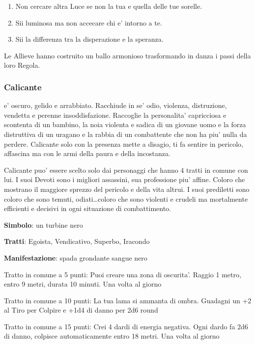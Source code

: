 \documentclass[a4paper,11pt,twoside,openany]{book}
\begin{document}
{\begin{enumerate}
	\item Non cercare altra Luce se non la tua e quella delle tue sorelle.

	\item Sii luminosa ma non accecare chi e' intorno a te.

	\item Sii la differenza tra la disperazione e la speranza.
\end{enumerate}

Le Allieve hanno costruito un ballo armonioso trasformando in danza i passi della loro Regola.

\subsubsection{Calicante}

\label{calicante}

e' oscuro, gelido e arrabbiato. Racchiude in se' odio, violenza, distruzione, vendetta e perenne insoddisfazione. Raccoglie la personalita' capricciosa e scontenta di un bambino, la noia violenta e sadica di un giovane uomo e la forza distruttiva di un uragano e la rabbia di un combattente che non ha piu' nulla da perdere. Calicante solo con la presenza mette a disagio, ti fa sentire in pericolo, affascina ma con le armi della paura e della incostanza.

Calicante puo' essere scelto solo dai personaggi che hanno 4 tratti in comune con lui. I suoi Devoti sono i migliori assassini, sua professione piu' affine. Coloro che mostrano il maggiore sprezzo del pericolo e della vita altrui. I suoi prediletti sono coloro che sono temuti, odiati\ldots coloro che sono violenti e crudeli ma mortalmente efficienti e decisivi in ogni situazione di combattimento.

\textbf{Simbolo}: un turbine nero

\textbf{Tratti}: Egoista, Vendicativo, Superbo, Iracondo

\textbf{Manifestazione}: spada grondante sangue nero

\bigskip

Tratto in comune a 5 punti: Puoi creare una zona di oscurita'. Raggio 1 metro, entro 9 metri, durata 10 minuti. Una volta al giorno

Tratto in comune a 10 punti: La tua lama si ammanta di ombra. Guadagni un +2 al Tiro per Colpire e +1d4 di danno per 2d6 round

Tratto in comune a 15 punti: Crei 4 dardi di energia negativa. Ogni dardo fa 2d6 di danno, colpisce automaticamente entro 18 metri. Una volta al giorno

}
\end{document}
